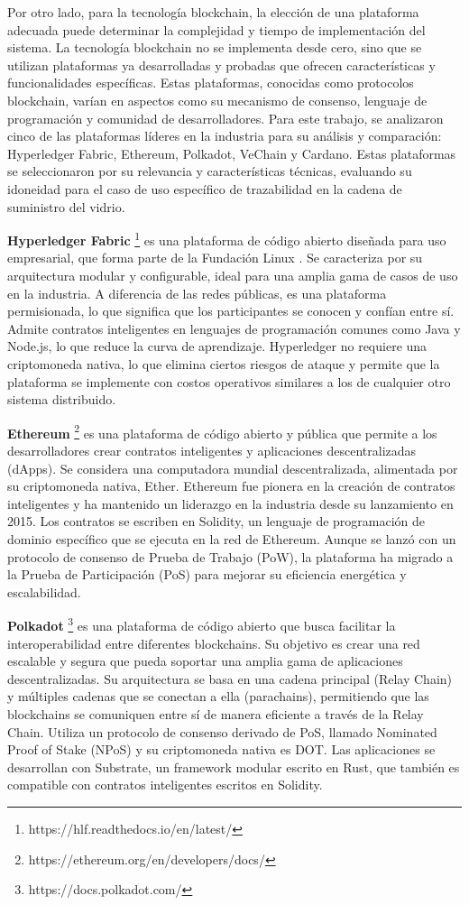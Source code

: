 Por otro lado, para la tecnología blockchain, la elección de una plataforma adecuada puede determinar la complejidad y tiempo de implementación del sistema.  La tecnología blockchain no se implementa desde cero, sino que se utilizan plataformas ya desarrolladas y probadas que ofrecen características y funcionalidades específicas. Estas plataformas, conocidas como protocolos blockchain, varían en aspectos como su mecanismo de consenso, lenguaje de programación y comunidad de desarrolladores. Para este trabajo, se analizaron cinco de las plataformas líderes en la industria para su análisis y comparación: Hyperledger Fabric, Ethereum, Polkadot, VeChain y Cardano. Estas plataformas se seleccionaron por su relevancia y características técnicas, evaluando su idoneidad para el caso de uso específico de trazabilidad en la cadena de suministro del vidrio.

\textbf{Hyperledger Fabric} \footnote{https://hlf.readthedocs.io/en/latest/}
es una plataforma de código abierto diseñada para uso empresarial, que forma parte de la Fundación Linux \cite{androulaki2018hyperledger}. Se caracteriza por su arquitectura modular y configurable, ideal para una amplia gama de casos de uso en la industria. A diferencia de las redes públicas, es una plataforma permisionada, lo que significa que los participantes se conocen y confían entre sí. Admite contratos inteligentes en lenguajes de programación comunes como Java y Node.js, lo que reduce la curva de aprendizaje. Hyperledger no requiere una criptomoneda nativa, lo que elimina ciertos riesgos de ataque y permite que la plataforma se implemente con costos operativos similares a los de cualquier otro sistema distribuido.

\textbf{Ethereum} \footnote{https://ethereum.org/en/developers/docs/}
es una plataforma de código abierto y pública que permite a los desarrolladores crear contratos inteligentes y aplicaciones descentralizadas (dApps). Se considera una computadora mundial descentralizada, alimentada por su criptomoneda nativa, Ether. Ethereum fue pionera en la creación de contratos inteligentes y ha mantenido un liderazgo en la industria desde su lanzamiento en 2015. Los contratos se escriben en Solidity, un lenguaje de programación de dominio específico que se ejecuta en la red de Ethereum. Aunque se lanzó con un protocolo de consenso de Prueba de Trabajo (PoW), la plataforma ha migrado a la Prueba de Participación (PoS) para mejorar su eficiencia energética y escalabilidad.

\textbf{Polkadot} \footnote{https://docs.polkadot.com/}
es una plataforma de código abierto que busca facilitar la interoperabilidad entre diferentes blockchains. Su objetivo es crear una red escalable y segura que pueda soportar una amplia gama de aplicaciones descentralizadas. Su arquitectura se basa en una cadena principal (Relay Chain) y múltiples cadenas que se conectan a ella (parachains), permitiendo que las blockchains se comuniquen entre sí de manera eficiente a través de la Relay Chain. Utiliza un protocolo de consenso derivado de PoS, llamado Nominated Proof of Stake (NPoS) y su criptomoneda nativa es DOT. Las aplicaciones se desarrollan con Substrate, un framework modular escrito en Rust, que también es compatible con contratos inteligentes escritos en Solidity.

